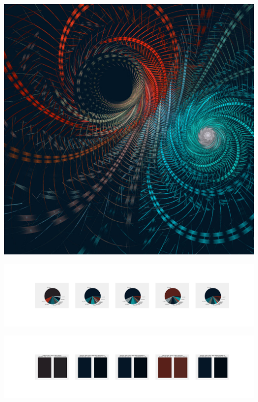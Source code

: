 \documentclass[11pt]{article}
\begin{document}
\begin{landscape}
    \begin{center}
    \includegraphics[width=\textwidth]{./nbimg/file (231).jpg}
    \end{center}

    \begin{center}
    \includegraphics[width=250mm]{./nbimg/pie-147.jpg}
    \end{center}

    \begin{center}
    \includegraphics[width=250mm]{./nbimg/peak-147.jpg}
    \end{center}
    


\end{landscape}
\end{document}
